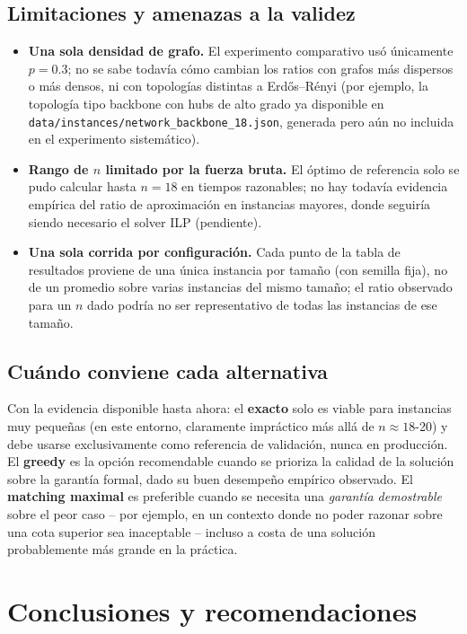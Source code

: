\documentclass[11pt,a4paper]{article}
\begin{document}
\subsection{Limitaciones y amenazas a la validez}
\begin{itemize}
	\item \textbf{Una sola densidad de grafo.} El experimento comparativo usó únicamente
	$p=0.3$; no se sabe todavía cómo cambian los ratios con grafos más dispersos o más
	densos, ni con topologías distintas a Erdős–Rényi (por ejemplo, la topología tipo
	backbone con hubs de alto grado ya disponible en
	\texttt{data/instances/network\_backbone\_18.json}, generada pero aún no incluida en el
	experimento sistemático).
	\item \textbf{Rango de $n$ limitado por la fuerza bruta.} El óptimo de referencia solo
	se pudo calcular hasta $n=18$ en tiempos razonables; no hay todavía evidencia empírica
	del ratio de aproximación en instancias mayores, donde seguiría siendo necesario el
	solver ILP (pendiente).
	\item \textbf{Una sola corrida por configuración.} Cada punto de la tabla de resultados
	proviene de una única instancia por tamaño (con semilla fija), no de un promedio sobre
	varias instancias del mismo tamaño; el ratio observado para un $n$ dado podría no ser
	representativo de todas las instancias de ese tamaño.
\end{itemize}

\subsection{Cuándo conviene cada alternativa}
Con la evidencia disponible hasta ahora: el \textbf{exacto} solo es viable para instancias
muy pequeñas (en este entorno, claramente impráctico más allá de $n\approx18$-20) y debe
usarse exclusivamente como referencia de validación, nunca en producción. El \textbf{greedy}
es la opción recomendable cuando se prioriza la calidad de la solución sobre la garantía
formal, dado su buen desempeño empírico observado. El \textbf{matching maximal} es
preferible cuando se necesita una \emph{garantía demostrable} sobre el peor caso -- por
ejemplo, en un contexto donde no poder razonar sobre una cota superior sea inaceptable --
incluso a costa de una solución probablemente más grande en la práctica.

\section{Conclusiones y recomendaciones}
\label{sec:conclusiones}
\end{document}
